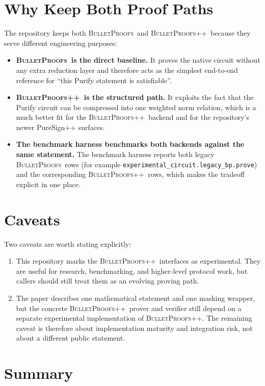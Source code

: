 \documentclass[11pt]{article}
\DeclareRobustCommand{\bp}{{\normalfont\scshape BulletProofs}}
\DeclareRobustCommand{\bppp}{{\normalfont\scshape BulletProofs++}}
\begin{document}
\section{Why Keep Both Proof Paths}

The repository keeps both \bp\ and \bppp\ because they serve different engineering purposes:
\begin{itemize}[nosep]
  \item \textbf{\bp\ is the direct baseline.} It proves the native circuit without any extra
  reduction layer and therefore acts as the simplest end-to-end reference for ``this Purify
  statement is satisfiable''.
  \item \textbf{\bppp\ is the structured path.} It exploits the fact that the Purify circuit can be
  compressed into one weighted norm relation, which is a much better fit for the
  \bppp\ backend and for the repository's newer PureSign++ surfaces.
  \item \textbf{The benchmark harness benchmarks both backends against the same statement.} The benchmark harness
  reports both legacy \bp\ rows (for example
  \texttt{experimental\_circuit.legacy\_bp.prove}) and the corresponding \bppp\ rows, which makes
  the tradeoff explicit in one place.
\end{itemize}

\section{Caveats}

Two caveats are worth stating explicitly:
\begin{enumerate}[nosep]
  \item This repository marks the \bppp\ interfaces as experimental. They are useful for
  research, benchmarking, and higher-level protocol work, but callers should still treat them as an
  evolving proving path.
  \item The paper describes one mathematical statement and one masking wrapper, but the concrete
  \bppp\ prover and verifier still depend on a separate experimental implementation of \bppp. The
  remaining caveat is therefore about implementation maturity and integration risk, not about a
  different public statement.
\end{enumerate}

\section{Summary}
\end{document}
